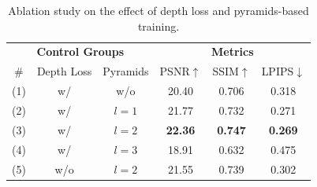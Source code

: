 \documentclass[lettersize,journal]{IEEEtran}
\begin{document}
\clearpage %
\begin{table}[!p] %
    \centering
    \vfill %
    \renewcommand{\arraystretch}{1.0} %
    \setlength{\tabcolsep}{10pt} %
    \caption{Ablation study on the effect of depth loss and pyramids-based training.}
    \label{tab:ablation}
    \begin{tabular}{@{}cccccc@{}}
        \toprule
        \multicolumn{3}{c}{\textbf{Control Groups}} & \multicolumn{3}{c}{\textbf{Metrics}} \\
        \cmidrule(lr){1-3} \cmidrule(lr){4-6}
        \# & Depth Loss & Pyramids & PSNR$\uparrow$ & SSIM$\uparrow$ & LPIPS$\downarrow$ \\
        \midrule
        (1) & w/ & w/o & 20.40 & 0.706 & 0.318 \\
        (2) & w/ & $l=1$ & 21.77 & 0.732 & 0.271 \\
        (3) & w/ & $l=2$ & \textbf{22.36} & \textbf{0.747} & \textbf{0.269} \\
        (4) & w/ & $l=3$ & 18.91 & 0.632 & 0.475 \\
        (5) & w/o & $l=2$ & 21.55 & 0.739 & 0.302 \\
        \bottomrule
    \end{tabular}
    \captionsetup{justification=centering, labelsep=colon} %
    \vfill %
\end{table}
\clearpage %


\clearpage %
\begin{table}[!p] %
    \centering
    \vfill %
    \renewcommand{\arraystretch}{1.2} %
    \setlength{\tabcolsep}{4pt} %
    \caption{The impact of keyframe selection and keyframe delay on performance.}
    \label{tab:keyframe_comparison}
    \vfill %
\end{table}
\clearpage %
\end{document}
